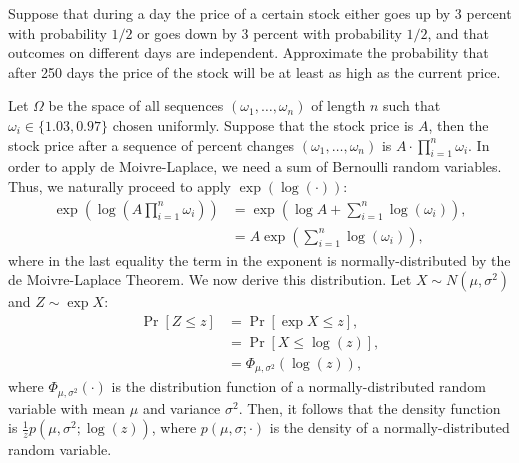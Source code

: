 \begin{problem}{9}
    Suppose that during a day the price of a certain stock either goes up by 3 percent with probability $1/2$ or goes down by 3 percent with probability $1/2$, and that outcomes on different days are independent. Approximate the probability that after 250 days the price of the stock will be at least as high as the current price.
\end{problem}
\begin{solution}
    Let $\Omega$ be the space of all sequences $(\omega_1, \ldots, \omega_n)$ of length $n$ such that $\omega_i \in \{1.03, 0.97\}$ chosen uniformly. Suppose that the stock price is $A$, then the stock price after a sequence of percent changes $(\omega_1,\ldots,\omega_n)$ is $A \cdot \prod_{i=1}^n \omega_i$. In order to apply de Moivre-Laplace, we need a sum of Bernoulli random variables. Thus, we naturally proceed to apply $\exp{(\log(\cdot))}$:
    \begin{align*}
        \exp\left(\log\left(A \prod_{i=1}^n \omega_i\right)\right) &= \exp\left(\log{A} + \sum_{i=1}^n \log(\omega_i)\right), \\
        &= A\exp\left(\sum_{i=1}^n \log(\omega_i)\right),
    \end{align*}
    where in the last equality the term in the exponent is normally-distributed by the de Moivre-Laplace Theorem. We now derive this distribution. Let $X \sim N(\mu,\sigma^2)$ and $Z \sim \exp{X}$:
    \begin{align*}
        \Pr[Z\leq z] &= \Pr[\exp{X} \leq z], \\
        &= \Pr[X\leq \log(z)], \\
        &= \Phi_{\mu, \sigma^2}(\log(z)),
    \end{align*}
    where $\Phi_{\mu,\sigma^2}(\cdot)$ is the distribution function of a normally-distributed random variable with mean $\mu$ and variance $\sigma^2$. Then, it follows that the density function is $\frac{1}{z} p(\mu,\sigma^2;\log(z))$, where $p(\mu,\sigma;\cdot)$ is the density of a normally-distributed random variable.


\end{solution}
